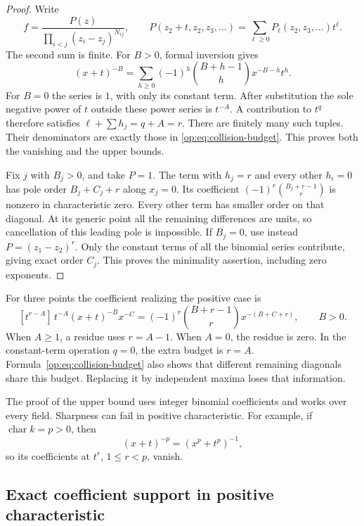 \begin{proof}
Write
\[
 f=\frac{P(z)}{\prod_{i<j}(z_i-z_j)^{N_{ij}}},\qquad
 P(z_2+t,z_2,z_3,\ldots)=\sum_{\ell\ge0}P_\ell(z_2,z_3,\ldots)t^\ell.
\]
The second sum is finite.  For \(B>0\), formal inversion gives
\begin{equation}\label{op:eq:binomial-pole}
 (x+t)^{-B}
 =\sum_{h\ge0}(-1)^h\binom{B+h-1}{h}x^{-B-h}t^h.
\end{equation}
For \(B=0\) the series is \(1\), with only its constant term.
After substitution the sole negative power of \(t\) outside these
power series is \(t^{-A}\).  A contribution to \(t^q\) therefore
satisfies
\(\ell+\sum h_j=q+A=r\).
There are finitely many such tuples.  Their denominators are exactly
those in \eqref{op:eq:collision-budget}.  This proves both the vanishing
and the upper bounds.

Fix \(j\) with \(B_j>0\), and take \(P=1\).  The term with
\(h_j=r\) and every other \(h_i=0\) has pole order
\(B_j+C_j+r\) along \(x_j=0\).  Its coefficient
\((-1)^r\binom{B_j+r-1}{r}\) is nonzero in characteristic zero.
Every other term has smaller order on that diagonal.  At its generic
point all the remaining differences are units, so cancellation of
this leading pole is impossible.  If \(B_j=0\), use instead
\(P=(z_1-z_2)^r\).  Only the constant terms of all the binomial
series contribute, giving exact order \(C_j\).  This proves the
minimality assertion, including zero exponents.
\end{proof}

For three points the coefficient realizing the positive case is
\begin{equation}\label{op:eq:sharp-three-point}
 [t^{r-A}]\,t^{-A}(x+t)^{-B}x^{-C}
 =(-1)^r\binom{B+r-1}{r}x^{-(B+C+r)},
 \qquad B>0.
\end{equation}
When \(A\ge1\), a residue uses \(r=A-1\).  When \(A=0\),
the residue is zero.  In the constant-term operation \(q=0\), the
extra budget is \(r=A\).  Formula~\eqref{op:eq:collision-budget} also
shows that different remaining diagonals share this budget.
Replacing it by independent maxima loses that information.

The proof of the upper bound uses integer binomial coefficients and
works over every field.  Sharpness can fail in positive characteristic.
For example, if \(\operatorname{char}k=p>0\), then
\[
 (x+t)^{-p}=(x^p+t^p)^{-1},
\]
so its coefficients at \(t^r\), \(1\le r<p\), vanish.

\subsection{Exact coefficient support in positive characteristic}
\label{op:subsec:positive-characteristic-poles}


